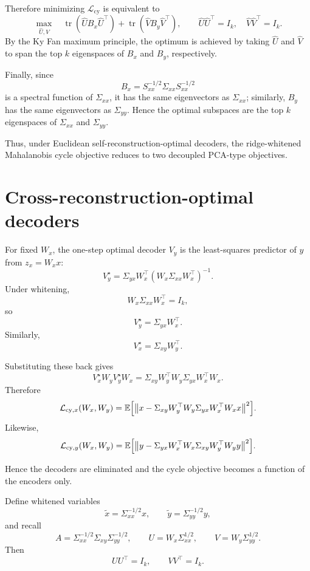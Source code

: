 \documentclass{article}
\begin{document}
Therefore minimizing \(\mathcal L_{\mathrm{cy}}\) is equivalent to
\[
\max_{\widehat U,\widehat V}
\quad
\operatorname{tr}(\widehat U B_x \widehat U^\top)
+
\operatorname{tr}(\widehat V B_y \widehat V^\top),
\qquad
\widehat U\widehat U^\top = I_k,\quad
\widehat V\widehat V^\top = I_k.
\]
By the Ky Fan maximum principle, the optimum is achieved by taking
\(\widehat U\) and \(\widehat V\) to span the top \(k\) eigenspaces of
\(B_x\) and \(B_y\), respectively.

Finally, since
\[
B_x = S_{xx}^{-1/2}\Sigma_{xx}S_{xx}^{-1/2}
\]
is a spectral function of \(\Sigma_{xx}\), it has the same eigenvectors as
\(\Sigma_{xx}\); similarly, \(B_y\) has the same eigenvectors as
\(\Sigma_{yy}\). Hence the optimal subspaces are the top \(k\) eigenspaces
of \(\Sigma_{xx}\) and \(\Sigma_{yy}\).

Thus, under Euclidean self-reconstruction-optimal decoders, the
ridge-whitened Mahalanobis cycle objective reduces to two decoupled
PCA-type objectives.

\section{Cross-reconstruction-optimal decoders}

For fixed \(W_x\), the one-step optimal decoder \(V_y\) is the least-squares predictor of \(y\) from \(z_x = W_x x\):
\[
V_y^\star
=
\Sigma_{yx} W_x^\top (W_x \Sigma_{xx} W_x^\top)^{-1}.
\]
Under whitening,
\[
W_x \Sigma_{xx} W_x^\top = I_k,
\]
so
\[
V_y^\star = \Sigma_{yx} W_x^\top.
\]
Similarly,
\[
V_x^\star = \Sigma_{xy} W_y^\top.
\]

Substituting these back gives
\[
V_x^\star W_y V_y^\star W_x
=
\Sigma_{xy} W_y^\top W_y \Sigma_{yx} W_x^\top W_x.
\]
Therefore
\[
\mathcal{L}_{\mathrm{cy},x}(W_x,W_y)
=
\mathbb{E}\Bigl[
\bigl\|
x - \Sigma_{xy} W_y^\top W_y \Sigma_{yx} W_x^\top W_x x
\bigr\|^2
\Bigr].
\]
Likewise,
\[
\mathcal{L}_{\mathrm{cy},y}(W_x,W_y)
=
\mathbb{E}\Bigl[
\bigl\|
y - \Sigma_{yx} W_x^\top W_x \Sigma_{xy} W_y^\top W_y y
\bigr\|^2
\Bigr].
\]

Hence the decoders are eliminated and the cycle objective becomes a function of the encoders only.

Define whitened variables
\[
\tilde x = \Sigma_{xx}^{-1/2} x,
\qquad
\tilde y = \Sigma_{yy}^{-1/2} y,
\]
and recall
\[
A = \Sigma_{xx}^{-1/2} \Sigma_{xy} \Sigma_{yy}^{-1/2},
\qquad
U = W_x \Sigma_{xx}^{1/2},
\qquad
V = W_y \Sigma_{yy}^{1/2}.
\]
Then
\[
U U^\top = I_k,
\qquad
V V^\top = I_k.
\]
\end{document}
